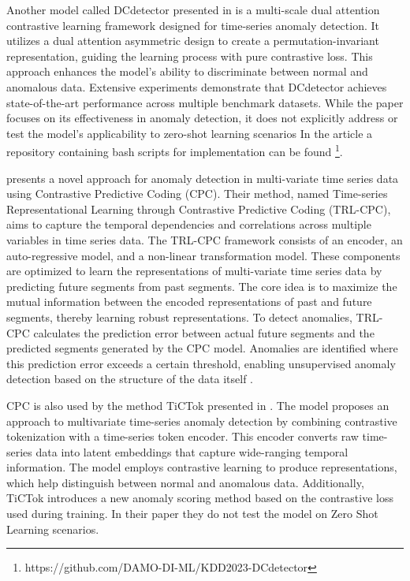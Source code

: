 Another model called DCdetector presented in \cite{yang_dcdetector_2023} is a multi-scale dual attention contrastive learning framework designed for time-series anomaly detection. It utilizes a dual attention asymmetric design to create a permutation-invariant representation, guiding the learning process with pure contrastive loss. This approach enhances the model's ability to discriminate between normal and anomalous data. Extensive experiments demonstrate that DCdetector achieves state-of-the-art performance across multiple benchmark datasets. While the paper focuses on its effectiveness in anomaly detection, it does not explicitly address or test the model's applicability to zero-shot learning scenarios \cite{yang_dcdetector_2023} In the article a repository containing bash scripts for implementation can be found \footnote{\fussy\tiny https://github.com/DAMO-DI-ML/KDD2023-DCdetector}.

\cite{pranavan_contrastive_2022} presents a novel approach for anomaly detection in multi-variate time series data using Contrastive Predictive Coding (CPC). Their method, named Time-series Representational Learning through Contrastive Predictive Coding (TRL-CPC), aims to capture the temporal dependencies and correlations across multiple variables in time series data.
The TRL-CPC framework consists of an encoder, an auto-regressive model, and a non-linear transformation model. These components are optimized to learn the representations of multi-variate time series data by predicting future segments from past segments. The core idea is to maximize the mutual information between the encoded representations of past and future segments, thereby learning robust representations.
To detect anomalies, TRL-CPC calculates the prediction error between actual future segments and the predicted segments generated by the CPC model. Anomalies are identified where this prediction error exceeds a certain threshold, enabling unsupervised anomaly detection based on the structure of the data itself \cite{pranavan_contrastive_2022}.

CPC is also used by the method TiCTok presented in \cite{kang_tictok_2023}. The model proposes an approach to multivariate time-series anomaly detection by combining contrastive tokenization with a time-series token encoder. This encoder converts raw time-series data into latent embeddings that capture wide-ranging temporal information. The model employs contrastive learning to produce representations, which help distinguish between normal and anomalous data. Additionally, TiCTok introduces a new anomaly scoring method based on the contrastive loss used during training. In their paper they do not test the model on Zero Shot Learning scenarios.


